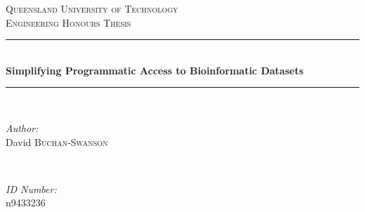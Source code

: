 
\begin{titlepage}

\newcommand{\HRule}{\rule{\linewidth}{0.5mm}} %

\centering %


\textsc{\LARGE Queensland University of Technology}\\[1cm] %
\textsc{\Large Engineering Honours Thesis}\\[0.5cm] %


\HRule \\[0.4cm]
{ \huge \bfseries Simplifying Programmatic Access to Bioinformatic Datasets}\\[0.2cm] %
\HRule \\[.5cm]


\begin{minipage}{0.45\textwidth}
\begin{flushleft} \large
\emph{Author:}\\
David \textsc{Buchan-Swanson}\\
\end{flushleft}
\end{minipage}
~
\begin{minipage}{0.45\textwidth}
\begin{flushright} \large
\emph{ID Number:}\\
n9433236\\
\end{flushright}
\end{minipage}\\[1cm]


\end{titlepage}
